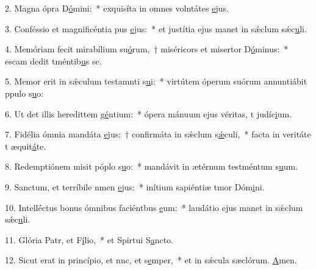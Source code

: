 2. Magna ópra D\uline{ó}mini:~* exquisíta in omnes volntátes \uline{e}jus.\par 
3. Conféssio et magnificéntia pus \uline{e}jus:~* et justítia ejus manet in sǽclum sǽc\uline{u}li.\par 
4. Memóriam fecit mirabílium su\uline{ó}rum,~† miséricors et misertor D\uline{ó}minus:~* escam dedit tméntib\uline{u}s se.\par 
5. Memor erit in sǽculum testamnti s\uline{u}i:~* virtútem óperum suórum annuntiábit ppulo s\uline{u}o:\par 
6. Ut det illis heredittem g\uline{é}ntium:~* ópera mánuum ejus véritas, t judíc\uline{i}um.\par 
7. Fidélia ómnia mandáta \uline{e}jus:~† confirmáta in sǽclum s\uline{ǽ}culi,~* facta in veritáte t æquit\uline{á}te.\par 
8. Redemptiónem misit póplo s\uline{u}o:~* mandávit in ætérnum testméntum s\uline{u}um.\par 
9. Sanctum, et terríbile nmen \uline{e}jus:~* inítium sapiéntiæ tmor Dóm\uline{i}ni.\par 
10. Intelléctus bonus ómnibus faciéntbus \uline{e}um:~* laudátio ejus manet in sǽclum sǽc\uline{u}li.\par 
11. Glória Patr, et F\uline{í}lio,~* et Spirtui S\uline{a}ncto.\par 
12. Sicut erat in princípio, et nnc, et s\uline{e}mper,~* et in sǽcula sæclórum. \uline{A}men.\par 
